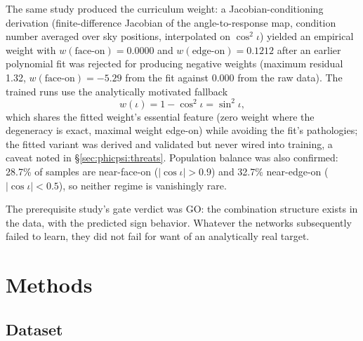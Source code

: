 \documentclass[11pt]{article}
\begin{document}
The same study produced the curriculum weight: a Jacobian-conditioning derivation (finite-difference Jacobian of the angle-to-response map, condition number averaged over sky positions, interpolated on $\cos^2\iota$) yielded an empirical weight with $w(\text{face-on}) = 0.0000$ and $w(\text{edge-on}) = 0.1212$ after an earlier polynomial fit was rejected for producing negative weights (maximum residual 1.32, $w(\text{face-on}) = -5.29$ from the fit against 0.000 from the raw data).
The trained runs use the analytically motivated fallback
\begin{equation}
    w(\iota) = 1 - \cos^2\iota = \sin^2\iota,
    \label{eq:curriculum}
\end{equation}
which shares the fitted weight's essential feature (zero weight where the degeneracy is exact, maximal weight edge-on) while avoiding the fit's pathologies; the fitted variant was derived and validated but never wired into training, a caveat noted in \S\ref{sec:phicpsi:threats}.
Population balance was also confirmed: 28.7\% of samples are near-face-on ($|\cos\iota| > 0.9$) and 32.7\% near-edge-on ($|\cos\iota| < 0.5$), so neither regime is vanishingly rare.

The prerequisite study's gate verdict was GO: the combination structure exists in the data, with the predicted sign behavior.
Whatever the networks subsequently failed to learn, they did not fail for want of an analytically real target.


\section{Methods}
\label{sec:phicpsi:methods}

\subsection{Dataset}
\label{sec:phicpsi:dataset}
\end{document}
